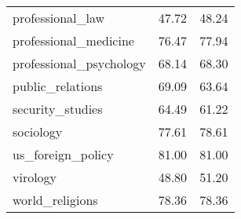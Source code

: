 \begin{table}[t]
\begin{tabular}{L{0.35}C{0.20}C{0.20}}
        professional\_law                       & 47.72                    & 48.24                      \\
        professional\_medicine                  & 76.47                    & 77.94                      \\
        professional\_psychology                & 68.14                    & 68.30                      \\
        public\_relations                       & 69.09                    & 63.64                      \\
        security\_studies                       & 64.49                    & 61.22                      \\
        sociology                               & 77.61                    & 78.61                      \\
        us\_foreign\_policy                     & 81.00                    & 81.00                      \\
        virology                                & 48.80                    & 51.20                      \\
        world\_religions                        & 78.36                    & 78.36                      \\
        \bottomrule
    \end{tabular}
\end{table}
\endgroup
